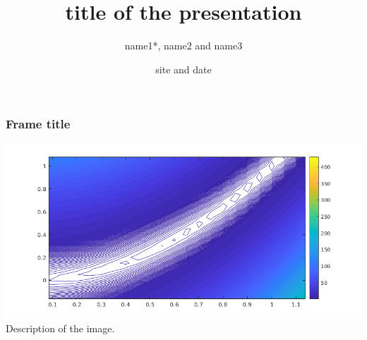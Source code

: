 \documentclass[aspectratio=169]{beamer}
\title{title of the presentation​​}
\author[name1, name2, name3]{name1*, name2 and name3}
\date[site]{site and date}
\begin{document}
\begin{frame}
 \titlepage 
\end{frame}

\begin{frame}
 \frametitle{Frame title}
 \includegraphics[scale=0.6]{images/rosenbrockzoom.png}
 Description of the image.
\end{frame}
\end{document}
